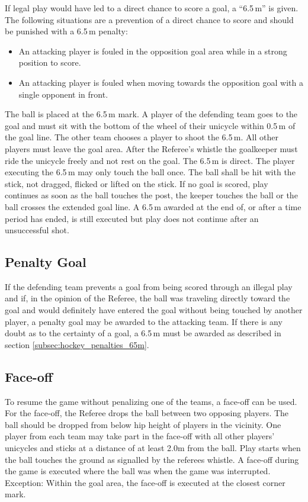 If legal play would have led to a direct chance to score a goal, a ``6.5\,m'' is given.
The following situations are a prevention of a direct chance to score and should be punished with a 6.5\,m penalty:
\begin{itemize}
\item An attacking player is fouled in the opposition goal area while in a strong position to score.
\item An attacking player is fouled when moving towards the opposition goal with a single opponent in front.
\end{itemize}
The ball is placed at the 6.5\,m mark.
A player of the defending team goes to the goal and must sit with the bottom of the wheel of their unicycle within 0.5\,m of the goal line.
The other team chooses a player to shoot the 6.5\,m.
All other players must leave the goal area.
After the Referee's whistle the goalkeeper must ride the unicycle freely and not rest on the goal.
The 6.5\,m is direct.
The player executing the 6.5\,m may only touch the ball once.
The ball shall be hit with the stick, not dragged, flicked or lifted on the stick.
If no goal is scored, play continues as soon as the ball touches the post, the keeper touches the ball or the ball crosses the extended goal line.
A 6.5\,m awarded at the end of, or after a time period has ended, is still executed but play does not continue after an unsuccessful shot.

\subsection{Penalty Goal}
If the defending team prevents a goal from being scored through an illegal play and if, in the opinion of the Referee, the ball was traveling directly toward the goal and would definitely have entered the goal without being touched by another player, a penalty goal may be awarded to the attacking team.
If there is any doubt as to the certainty of a goal, a 6.5\,m must be awarded as described in section \ref{subsec:hockey_penalties_65m}.

\subsection{Face-off \label{subsec:hockey_penalties_face-off}}
To resume the game without penalizing one of the teams, a face-off can be used.
For the face-off, the Referee drops the ball between two opposing players.
The ball should be dropped from below hip height of players in the vicinity.
One player from each team may take part in the face-off with all other players’ unicycles and sticks at a distance of at least 2.0m from the ball.
Play starts when the ball touches the ground as signalled by the referees whistle.
A face-off during the game is executed where the ball was when the game was interrupted.
Exception: Within the goal area, the face-off is executed at the closest corner mark.

